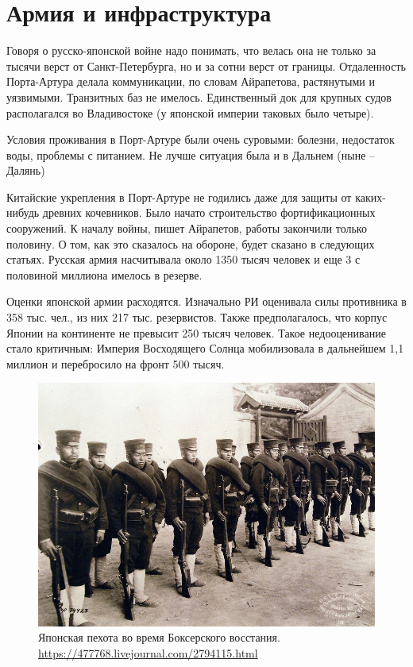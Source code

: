 \section{Армия и инфраструктура}

Говоря о русско-японской войне надо понимать, что велась она не только за тысячи верст от Санкт-Петербурга, но и за сотни верст от границы. Отдаленность Порта-Артура делала коммуникации, по словам Айрапетова, растянутыми и уязвимыми. Транзитных баз не имелось. Единственный док для крупных судов располагался во Владивостоке (у японской империи таковых было четыре).

Условия проживания в Порт-Артуре были очень суровыми: болезни, недостаток воды, проблемы с питанием. Не лучше ситуация была и в Дальнем (ныне – Далянь)

Китайские укрепления в Порт-Артуре не годились даже для защиты от каких-нибудь древних кочевников. Было начато строительство фортификационных сооружений. К началу войны, пишет Айрапетов, работы закончили только половину. О том, как это сказалось на обороне, будет сказано в следующих статьях.
Русская армия насчитывала около 1350 тысяч человек и еще 3 с половиной миллиона имелось в резерве.

Оценки японской армии расходятся. Изначально РИ оценивала силы противника в 358 тыс. чел., из них 217 тыс. резервистов. Также предполагалось, что корпус Японии на континенте не превысит 250 тысяч человек. Такое недооценивание стало критичным: Империя Восходящего Солнца мобилизовала в дальнейшем 1,1 миллион и перебросило на фронт 500 тысяч.

\begin{figure}[h!tb] 
	\centering\includegraphics[scale=0.4]{Data/RYAV_sily_storon/kGNdyBmjr4c.jpg}
	\caption{Японская пехота во время Боксерского восстания.  \url{https://477768.livejournal.com/2794115.html}
	}
\end{figure}

